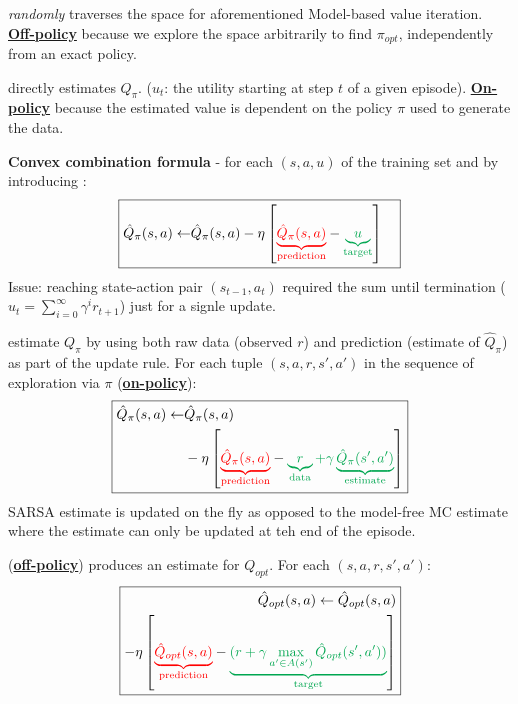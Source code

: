  \emph{randomly} traverses the space for
aforementioned Model-based value iteration. \textbf{\underline{Off-policy}}
because we explore the space arbitrarily to find $\pi_{opt}$, independently from
an exact policy.

 directly estimates $Q_\pi$.
($u_t$: the utility starting at step $t$ of a given episode).
\textbf{\underline{On-policy}} because the estimated value is dependent
on the policy $\pi$ used to generate the data.

\textbf{Convex combination formula} - for each $(s,a,u)$ of the training set and by
introducing :
\begin{displaymath}
\boxed{
\begin{aligned}
    \hat{Q}_\pi(s,a) \leftarrow & \hat{Q}_\pi(s,a) - \eta \left[
        \textcolor{red}{\underbrace{\hat{Q}_\pi(s,a)}_{\text{prediction}}}
        - \textcolor{Green}{\underbrace{u}_{\text{target}}}
    \right]
\end{aligned}
}
\end{displaymath}
Issue: reaching state-action pair $(s_{t-1}, a_t)$ required the sum until
termination ($u_t = \sum_{i=0}^{\infty}\gamma^i r_{t+1}$) just for a signle
update.

 estimate $Q_\pi$ by using both raw data (observed $r$) and
prediction (estimate of $\hat{Q}_\pi$) as part of the update rule. For each
tuple $(s,a,r,s',a')$ in the sequence of exploration via $\pi$
(\textbf{\underline{on-policy}}):
\begin{displaymath}
\boxed{
\begin{aligned}
    \hat{Q}_\pi(s,a) \leftarrow & \hat{Q}_\pi(s,a) \\
    &- \eta \left[
        \textcolor{red}{\underbrace{\hat{Q}_\pi(s,a)}_{\text{prediction}}}
        - \textcolor{Green}{\underbrace{r}_{\text{data}} + \gamma \underbrace{\hat{Q}_\pi(s',a')}_{\text{estimate}}}
    \right]
\end{aligned}
}
\end{displaymath}
SARSA estimate is updated on the fly as opposed to the model-free MC estimate
where the estimate can only be updated at teh end of the episode.

 (\textbf{\underline{off-policy}}) produces an estimate for
$Q_{opt}$. For each $(s,a,r,s',a')$:
\begin{displaymath}
\boxed{
\begin{aligned}
    \hat{Q}_{opt}(s,a) \leftarrow \hat{Q}_{opt}(s,a) \\
    - \eta \left[
        \textcolor{red}{\underbrace{\hat{Q}_{opt}(s,a)}_{\text{prediction}}}
        - \textcolor{Green}{\underbrace{(r + \gamma \max_{a' \in A(s')}\hat{Q}_{opt}(s',a'))}_{\text{target}}}
    \right]
\end{aligned}
}
\end{displaymath}

